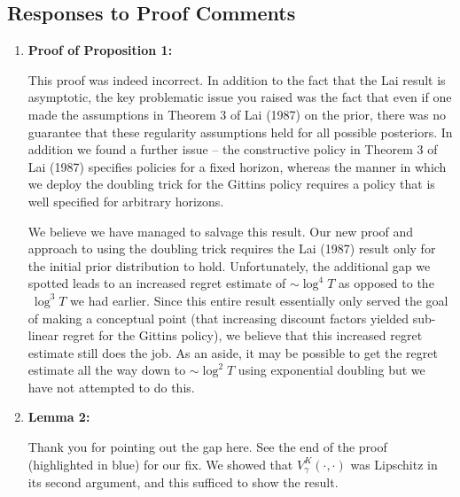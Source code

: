 \documentclass[11pt]{article}
\newcommand{\1}{\ensuremath{\mathbf{1}}} %
\theoremstyle{thm-sf}
\begin{document}
	\subsection{Responses to Proof Comments}
	
	\begin{enumerate}
		\item \textbf {Proof of Proposition 1:} 	
		
		{\color{blue}
		This proof was indeed incorrect. In addition to the fact that the Lai result is asymptotic, the key problematic issue you raised was the fact that even if one made the assumptions in Theorem 3 of Lai (1987) on the prior, there was no guarantee that these regularity assumptions held for all possible posteriors. In addition we found a further issue -- the constructive policy in Theorem 3 of Lai (1987) specifies policies for a fixed horizon, whereas the manner in which we deploy the doubling trick for the Gittins policy requires a policy that is well specified for arbitrary horizons. 
		
		We believe we have managed to salvage this result. Our new proof and approach to using the doubling trick requires the Lai (1987) result only for the initial prior distribution to hold. Unfortunately, the additional gap we spotted leads to an increased regret estimate of $\sim \log^4 T$ as opposed to the $~ \log^3 T$ we had earlier. Since this entire result essentially only served the goal of making a conceptual point (that increasing discount factors yielded sub-linear regret for the Gittins policy), we believe that this increased regret estimate still does the job. As an aside, it may be possible to get the regret estimate all the way down to $\sim \log^2 T$ using exponential doubling but we have not attempted to do this. 
}
		
		
		\item \textbf {Lemma 2:} 
		
		{\color{blue}	
		Thank you for pointing out the gap here. See the end of the proof (highlighted in blue) for our fix. We showed that $V^K_\gamma(\cdot, \cdot)$ was Lipschitz in its second argument, and this sufficed to show the result.}
		
	\end{enumerate}
	
\end{document}

